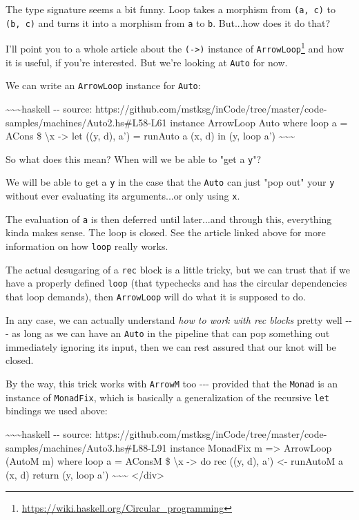 \documentclass[]{article}
\renewcommand{\href}[2]{#2\footnote{\url{#1}}}
\begin{document}
The type signature seems a bit funny. Loop takes a morphism from
\texttt{(a,\ c)} to \texttt{(b,\ c)} and turns it into a morphism from
\texttt{a} to \texttt{b}. But...how does it do that?

I'll point you to \href{https://wiki.haskell.org/Circular_programming}{a whole
article about the \texttt{(-\textgreater{})} instance of \texttt{ArrowLoop}} and
how it is useful, if you're interested. But we're looking at \texttt{Auto} for
now.

We can write an \texttt{ArrowLoop} instance for \texttt{Auto}:

\textasciitilde{}\textasciitilde{}\textasciitilde{}haskell -\/- source:
https://github.com/mstksg/inCode/tree/master/code-samples/machines/Auto2.hs\#L58-L61
instance ArrowLoop Auto where loop a = ACons \$ \textbackslash{}x
-\textgreater{} let ((y, d), a') = runAuto a (x, d) in (y, loop a')
\textasciitilde{}\textasciitilde{}\textasciitilde{}

So what does this mean? When will we be able to "get a \texttt{y}"?

We will be able to get a \texttt{y} in the case that the \texttt{Auto} can just
"pop out" your \texttt{y} without ever evaluating its arguments...or only using
\texttt{x}.

The evaluation of \texttt{a\textquotesingle{}} is then deferred until
later...and through this, everything kinda makes sense. The loop is closed. See
the article linked above for more information on how \texttt{loop} really works.

The actual desugaring of a \texttt{rec} block is a little tricky, but we can
trust that if we have a properly defined \texttt{loop} (that typechecks and has
the circular dependencies that loop demands), then \texttt{ArrowLoop} will do
what it is supposed to do.

In any case, we can actually understand \emph{how to work with rec blocks}
pretty well -\/-\/- as long as we can have an \texttt{Auto} in the pipeline that
can pop something out immediately ignoring its input, then we can rest assured
that our knot will be closed.

By the way, this trick works with \texttt{ArrowM} too -\/-\/- provided that the
\texttt{Monad} is an instance of \texttt{MonadFix}, which is basically a
generalization of the recursive \texttt{let} bindings we used above:

\textasciitilde{}\textasciitilde{}\textasciitilde{}haskell -\/- source:
https://github.com/mstksg/inCode/tree/master/code-samples/machines/Auto3.hs\#L88-L91
instance MonadFix m =\textgreater{} ArrowLoop (AutoM m) where loop a = AConsM \$
\textbackslash{}x -\textgreater{} do rec ((y, d), a') \textless{}- runAutoM a
(x, d) return (y, loop a') \textasciitilde{}\textasciitilde{}\textasciitilde{}
\textless{}/div\textgreater{}
\end{document}
